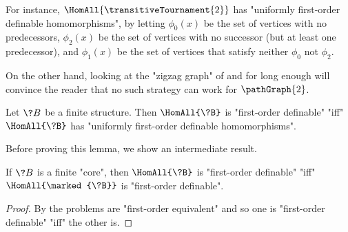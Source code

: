 \begin{example}
	\AP\label{ex:zigzag-FO}
	For instance, $\HomAll{\transitiveTournament{2}}$ has "uniformly first-order definable homomorphisms", by letting $\phi_0(x)$ be the set of vertices with no
	predecessors, $\phi_2(x)$ be the set of vertices with no successor (but at least one predecessor), and $\phi_1(x)$ be the set of vertices that satisfy neither $\phi_0$ not $\phi_2$.

	On the other hand, looking at the "zigzag graph" of  and 
	for long enough will convince the reader that no such strategy can work
	for $\pathGraph{2}$.
\end{example}

\begin{lemma}
	\AP\label{lemma:finite-duality-uniformly-definable-homomorphisms}
	Let $\?B$ be a finite structure. Then $\HomAll{\?B}$ is "first-order definable" "iff"
	$\HomAll{\?B}$ has "uniformly first-order definable homomorphisms".%
\end{lemma}

Before proving this lemma, we show an intermediate result.
\begin{fact}
	\AP\label{fact:marking-preserves-finite-duality}
	If $\?B$ is a finite "core", then $\HomAll{\?B}$ is "first-order definable"
	"iff" $\HomAll{\marked{\?B}}$ is "first-order definable".
\end{fact}

\begin{proof}
	By  the problems are "first-order 
	equivalent" and so one is "first-order definable" "iff" the other is.
\end{proof}

